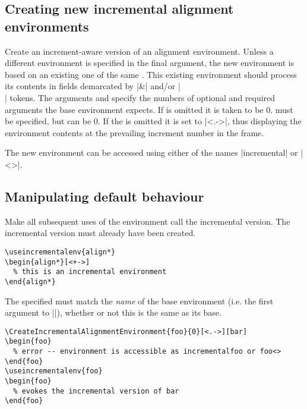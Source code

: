 \documentclass[a4paper]{ltxdoc}
\begin{document}
\subsection{Creating new incremental alignment environments}\label{sec:align:new}

\begin{command}{{\CreateIncrementalAlignmentEnvironment}}

  Create an increment-aware version of an alignment environment.  Unless a
  different  environment is specified in the final argument, the new
  environment is based on an existing one of the same .  This
  existing environment should process its contents in fields demarcated by |&|
  and/or |\\| tokens.  The arguments  and  specify the
  numbers of optional and required arguments the base environment expects.  If
   is omitted it is taken to be 0.   must be specified,
  but can be 0.  If the  is omitted it is set to
  |<.->|, thus displaying the environment contents at the prevailing increment
  number in the frame.

  The new environment can be accessed using either of the names
  |incremental| or |<>|.
\end{command}

\subsection{Manipulating default behaviour}\label{sec:align:defaults}

\begin{command}{{\useincrementalenv}}
  Make all subsequent uses of the  environment call the incremental
  version.  The incremental version must already have been created.
  \example
\begin{verbatim}
\useincrementalenv{align*}
\begin{align*}[<+->]
  % this is an incremental environment
\end{align*}
\end{verbatim}
  The specified  must match the \emph{name} of the base environment
  (i.e. the first argument to |\CreateIncrementalAlignmentEnvironment|), whether
  or not this is the same as its base.
\begin{verbatim}
\CreateIncrementalAlignmentEnvironment{foo}{0}[<.->][bar]
\begin{foo}
  % error -- environment is accessible as incrementalfoo or foo<>
\end{foo}
\useincrementalenv{foo}
\begin{foo}
  % evokes the incremental version of bar
\end{foo}
\end{verbatim}
\end{command}
\end{document}
